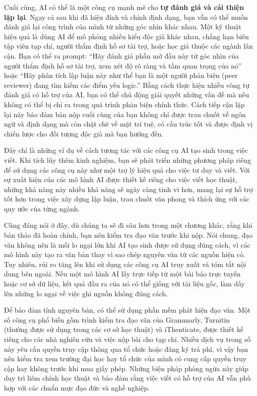 Cuối cùng, AI có thể là một công cụ mạnh mẽ cho \textbf{tự đánh giá và cải thiện lặp lại}. Ngay cả sau khi đã hiệu đính và chỉnh định dạng, bạn vẫn có thể muốn đánh giá lại công trình của mình từ những góc nhìn khác nhau. Một kỹ thuật hiệu quả là dùng AI để mô phỏng nhiều kiểu độc giả khác nhau, chẳng hạn biên tập viên tạp chí, người thẩm định hồ sơ tài trợ, hoặc học giả thuộc các ngành lân cận. Bạn có thể ra prompt: ``Hãy đánh giá phần mở đầu này từ góc nhìn của người thẩm định hồ sơ tài trợ, xem xét độ rõ ràng và tầm quan trọng của nó'' hoặc ``Hãy phân tích lập luận này như thể bạn là một người phản biện (peer reviewer) đang tìm kiếm các điểm yếu logic.'' Bằng cách thực hiện nhiều vòng tự đánh giá có hỗ trợ của AI, bạn có thể chủ động giải quyết những vấn đề mà nếu không có thể bị chỉ ra trong quá trình phản biện chính thức. Cách tiếp cận lặp lại này bảo đảm bản nộp cuối cùng của bạn không chỉ được trau chuốt về ngôn ngữ và định dạng mà còn chặt chẽ về mặt trí tuệ, có cấu trúc tốt và được định vị chiến lược cho đối tượng độc giả mà bạn hướng đến.

Đây chỉ là những ví dụ về cách tương tác với các công cụ AI tạo sinh trong việc viết. Khi tích lũy thêm kinh nghiệm, bạn sẽ phát triển những phương pháp riêng để sử dụng các công cụ này như một trợ lý hiệu quả cho việc tư duy và viết. Với sự xuất hiện của các mô hình AI được thiết kế riêng cho việc viết học thuật, những khả năng này nhiều khả năng sẽ ngày càng tinh vi hơn, mang lại sự hỗ trợ tốt hơn trong việc xây dựng lập luận, trau chuốt văn phong và thích ứng với các quy ước của từng ngành.

Cũng đáng nói ở đây, dù chúng ta sẽ đi sâu hơn trong một chương khác, rằng khi bản thảo đã hoàn chỉnh, bạn nên kiểm tra đạo văn trước khi nộp. Nói chung, đạo văn không nên là mối lo ngại lớn khi AI tạo sinh được sử dụng đúng cách, vì các mô hình này tạo ra văn bản thay vì sao chép nguyên văn từ các nguồn hiện có. Tuy nhiên, rủi ro tăng lên khi sử dụng các công cụ AI truy xuất và tóm tắt nội dung bên ngoài. Nếu một mô hình AI lấy trực tiếp từ một bài báo trực tuyến hoặc cơ sở dữ liệu, kết quả đầu ra của nó có thể giống với tài liệu gốc, làm dấy lên những lo ngại về việc ghi nguồn không đúng cách.

Để bảo đảm tính nguyên bản, có thể sử dụng phần mềm phát hiện đạo văn. Một số công cụ phổ biến gồm trình kiểm tra đạo văn của Grammarly, Turnitin (thường được sử dụng trong các cơ sở học thuật) và iThenticate, được thiết kế riêng cho các nhà nghiên cứu và việc nộp bài cho tạp chí. Nhiều dịch vụ trong số này yêu cầu quyền truy cập thông qua tổ chức hoặc đăng ký trả phí, vì vậy bạn nên kiểm tra xem trường đại học hay tổ chức của mình có cung cấp quyền truy cập hay không trước khi mua giấy phép. Những biện pháp phòng ngừa này giúp duy trì liêm chính học thuật và bảo đảm rằng việc viết có hỗ trợ của AI vẫn phù hợp với các chuẩn mực đạo đức và nghề nghiệp.

